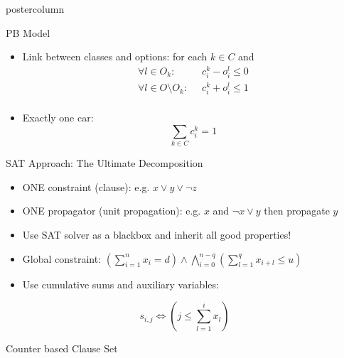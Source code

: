 \documentclass[final]{beamer}
\begin{document}
\begin{frame}
\begin{columns}
\begin{column}{.49\textwidth}
\begin{beamercolorbox}[center,wd=\textwidth]{postercolumn}
\begin{minipage}[T]{.95\textwidth}
{\begin{block}{PB Model}
                \begin{itemize}
                    \item Link between classes and options: for each $k\in C$ and 
                        \begin{align*}
                            \forall l \in O_k :\;\; & c^k_i - o^l_i \leq 0 \\
                            \forall l \in O \setminus O_k :\;\; &c^k_i + o^l_i \leq 1\\
                        \end{align*}
                    \item Exactly one car:  $$\sum_{k\in C} c^k_i = 1$$  
                \end{itemize}
            \end{block}
            \vfill
            \begin{block}{SAT Approach: The Ultimate Decomposition}
                \begin{itemize}
                \itemsep1pt\parskip0pt
                \item ONE constraint (clause): e.g. $x \vee y \vee \neg z$
                \item ONE propagator (unit propagation): e.g. $x$ and $\neg x \vee y$ then propagate $y$
                \item Use SAT solver as a blackbox and inherit all good properties!
                \item Global constraint: $(\sum_{i=1}^n x_{i} = d) \wedge\bigwedge_{i=0}^{n-q}(\sum_{l=1}^q x_{i+l} \leq u )$
                \item Use cumulative sums and auxiliary variables:
                \end{itemize}

                    $$ s_{i,j} \iff (j \leq \sum_{l=1}^{i} x_{l}) $$
                
            \end{block}
            \vfill
            \begin{block}{Counter based Clause Set}%
                \begin{center}
                                          
\end{center}
\end{block}}
\end{minipage}
\end{beamercolorbox}
\end{column}
\end{columns}
\end{frame}
\end{document}
